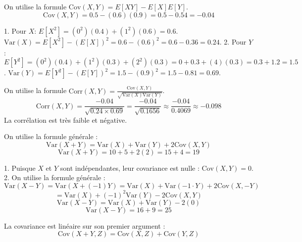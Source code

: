 \begin{correctionbox}
On utilise la formule $\text{Cov}(X,Y) = E[XY] - E[X]E[Y]$.
$$ \text{Cov}(X,Y) = 0.5 - (0.6)(0.9) = 0.5 - 0.54 = -0.04 $$
\end{correctionbox}

\begin{correctionbox}
1.  Pour $X$:
    $E[X^2] = (0^2)(0.4) + (1^2)(0.6) = 0.6$.
    $\text{Var}(X) = E[X^2] - (E[X])^2 = 0.6 - (0.6)^2 = 0.6 - 0.36 = 0.24$.
2.  Pour $Y$:
    $E[Y^2] = (0^2)(0.4) + (1^2)(0.3) + (2^2)(0.3) = 0 + 0.3 + (4)(0.3) = 0.3 + 1.2 = 1.5$.
    $\text{Var}(Y) = E[Y^2] - (E[Y])^2 = 1.5 - (0.9)^2 = 1.5 - 0.81 = 0.69$.
\end{correctionbox}

\begin{correctionbox}
On utilise la formule $\text{Corr}(X,Y) = \frac{\text{Cov}(X,Y)}{\sqrt{\text{Var}(X)\text{Var}(Y)}}$.
$$ \text{Corr}(X,Y) = \frac{-0.04}{\sqrt{0.24 \times 0.69}} = \frac{-0.04}{\sqrt{0.1656}} \approx \frac{-0.04}{0.4069} \approx -0.098 $$
La corrélation est très faible et négative.
\end{correctionbox}


\begin{correctionbox}
On utilise la formule générale :
$$ \text{Var}(X+Y) = \text{Var}(X) + \text{Var}(Y) + 2\text{Cov}(X,Y) $$
$$ \text{Var}(X+Y) = 10 + 5 + 2(2) = 15 + 4 = 19 $$
\end{correctionbox}

\begin{correctionbox}
1.  Puisque $X$ et $Y$ sont indépendantes, leur covariance est nulle : $\text{Cov}(X,Y) = 0$.
2.  On utilise la formule générale :
    $$ \text{Var}(X-Y) = \text{Var}(X + (-1)Y) = \text{Var}(X) + \text{Var}(-1 \cdot Y) + 2\text{Cov}(X, -Y) $$
    $$ = \text{Var}(X) + (-1)^2 \text{Var}(Y) - 2\text{Cov}(X, Y) $$
    $$ \text{Var}(X-Y) = \text{Var}(X) + \text{Var}(Y) - 2(0) $$
    $$ \text{Var}(X-Y) = 16 + 9 = 25 $$
\end{correctionbox}

\begin{correctionbox}
La covariance est linéaire sur son premier argument :
$$ \text{Cov}(X+Y, Z) = \text{Cov}(X, Z) + \text{Cov}(Y, Z) $$
\end{correctionbox}

